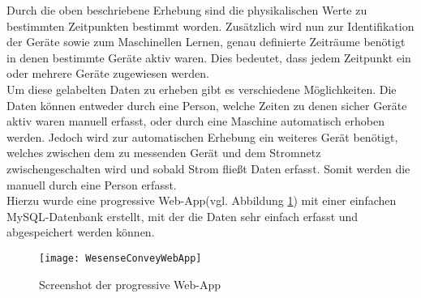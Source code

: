         Durch die oben beschriebene Erhebung sind die physikalischen Werte zu bestimmten Zeitpunkten bestimmt worden.
        Zusätzlich wird nun zur Identifikation der Geräte sowie zum Maschinellen Lernen, genau definierte Zeiträume benötigt in denen bestimmte Geräte aktiv waren.
        Dies bedeutet, dass jedem Zeitpunkt ein oder mehrere Geräte zugewiesen werden. \\
        \newline
        Um diese gelabelten Daten zu erheben gibt es verschiedene Möglichkeiten.
        Die Daten können entweder durch eine Person, welche Zeiten zu denen sicher Geräte aktiv waren manuell erfasst, oder durch eine Maschine automatisch erhoben werden.
        Jedoch wird zur automatischen Erhebung ein weiteres Gerät benötigt, welches zwischen dem zu messenden Gerät und dem Stromnetz zwischengeschalten wird und sobald Strom fließt Daten erfasst.
        Somit werden die manuell durch eine Person erfasst.\\
        \newline
        Hierzu wurde eine progressive Web-App(vgl. Abbildung \ref{fig:WebApp1}) mit einer einfachen MySQL-Datenbank erstellt, mit der die Daten sehr einfach erfasst und abgespeichert werden können.

        \begin{figure}[h]
            \centering
            \texttt{[image: WesenseConveyWebApp]}
            \caption{Screenshot der progressive Web-App}
            \label{fig:WebApp1}
        \end{figure}
        